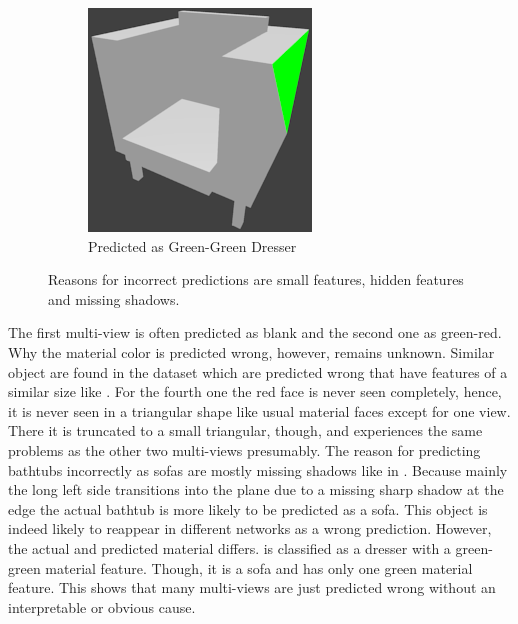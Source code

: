 \begin{figure}
\begin{subfigure}{.3\textwidth}
		\centering
		\includegraphics[width=.8\textwidth]{images/sofa_0681_1_010.png}
		\caption{Predicted as Green-Green Dresser}
		\label{fig:small-features-f}
	\end{subfigure}
	\caption[Reasons for Incorrect Predictions]{Reasons for incorrect predictions are small features, hidden features and missing shadows.}
	\label{fig:small-features}
\end{figure}
The first multi-view is often predicted as blank and the second one as green-red.
Why the material color is predicted wrong, however, remains unknown.
Similar object are found in the dataset which are predicted wrong that have features of a similar size like .
For the fourth one the red face is never seen completely, hence, it is never seen in a triangular shape like usual material faces except for one view.
There it is truncated to a small triangular, though, and experiences the same problems as the other two multi-views presumably.
The reason for predicting bathtubs incorrectly as sofas are mostly missing shadows like in .
Because mainly the long left side transitions into the plane due to a missing sharp shadow at the edge the actual bathtub is more likely to be predicted as a sofa.
This object is indeed likely to reappear in different networks as a wrong prediction.
However, the actual and predicted material differs.
 is classified as a dresser with a green-green material feature.
Though, it is a sofa and has only one green material feature.
This shows that many multi-views are just predicted wrong without an interpretable or obvious cause.